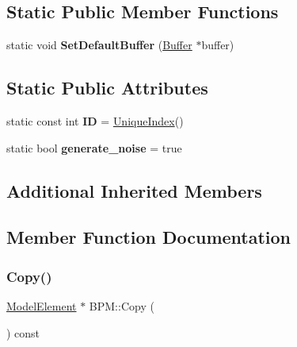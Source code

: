 \subsection*{Static Public Member Functions}
\begin{DoxyCompactItemize}
\item 
\mbox{\label{classBPM_a11a2523361aa03be19252b5335efdc48}} 
static void {\bfseries Set\+Default\+Buffer} (\hyperlink{classBPM_1_1Buffer}{Buffer} $\ast$buffer)
\end{DoxyCompactItemize}
\subsection*{Static Public Attributes}
\begin{DoxyCompactItemize}
\item 
\mbox{\label{classBPM_a093ea71219d65492338ac96da3df0b70}} 
static const int {\bfseries ID} = \hyperlink{classAcceleratorComponent_aa7ad4d39e1a488b705983842ed1ac784}{Unique\+Index}()
\item 
\mbox{\label{classBPM_acdece9060883eb54d96949f62ae5e91c}} 
static bool {\bfseries generate\+\_\+noise} = true
\end{DoxyCompactItemize}
\subsection*{Additional Inherited Members}


\subsection{Member Function Documentation}
\mbox{\label{classBPM_a21bba21422046a434a38268c0cb5ada6}} 
\subsubsection{\texorpdfstring{Copy()}{Copy()}}
{\footnotesize\ttfamily \hyperlink{classModelElement}{Model\+Element} $\ast$ B\+P\+M\+::\+Copy (\begin{DoxyParamCaption}{ }\end{DoxyParamCaption}) const\hspace{0.3cm}{\ttfamily [virtual]}}

